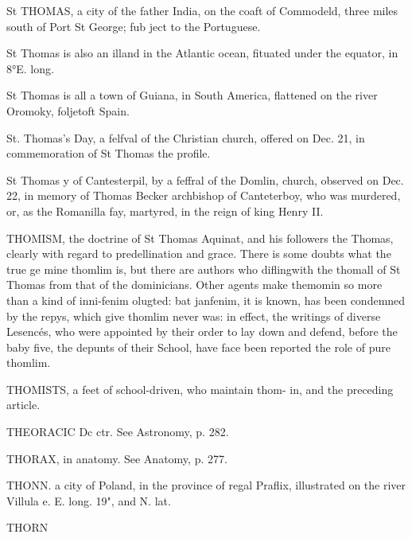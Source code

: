 St THOMAS, a city of the father India, on the coaft of Commodeld, three miles south of Port St George; fub ject to the Portuguese.\par\medskip
St Thomas is also an illand in the Atlantic ocean, fituated under the equator, in 8°E. long.\par\medskip
St Thomas is all a town of Guiana, in South America, flattened on the river Oromoky, foljetoft Spain.\par\medskip
St. Thomas’s Day, a felfval of the Christian church, offered on Dec. 21, in commemoration of St Thomas the profile.\par\medskip
St Thomas y of Cantesterpil, by a feffral of the Domlin, church, observed on Dec. 22, in memory of Thomas Becker archbishop of Canteterboy, who was murdered, or, as the Romanilla fay, martyred, in the reign of king Henry II.\par\medskip
THOMISM, the doctrine of St Thomas Aquinat, and his followers the Thomas, clearly with regard to predellination and grace. There is some doubts what the true ge mine thomlim is, but there are authors who diflingwith the thomall of St Thomas from that of the dominicians. Other agents make themomin so more than a kind of inni-fenim olugted: bat janfenim, it is known, has been condemned by the repys, which give thomlim never was: in effect, the writings of diverse Lesencés, who were appointed by their order to lay down and defend, before the baby five, the depunts of their School, have face been reported the role of pure thomlim.\par\medskip
THOMISTS, a feet of school-driven, who maintain thom- in, and the preceding article.\par\medskip
THEORACIC Dc ctr. See Astronomy, p. 282.\par\medskip
THORAX, in anatomy. See Anatomy, p. 277.\par\medskip
THONN. a city of Poland, in the province of regal Praflix, illustrated on the river Villula e. E. long. 19", and N. lat.\par\medskip
THORN\par\medskip
